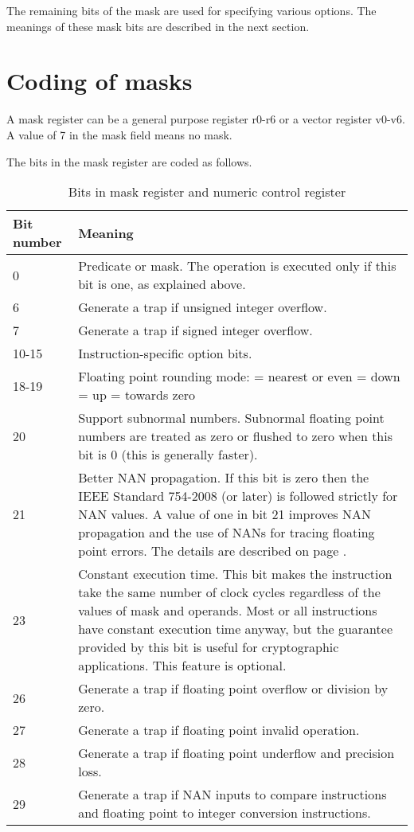 \documentclass[forwardcom.tex]{subfiles}
\begin{document}
The remaining bits of the mask are used for specifying various options.
The meanings of these mask bits are described in the next section.

\section{Coding of masks}
A mask register can be a general purpose register r0-r6 or a vector register v0-v6. A value of 7 in the mask field means no mask.
\vspace{2mm}

The bits in the mask register are coded as follows.

\begin{longtable}
{|p{15mm}|p{90mm}|}
\caption{Bits in mask register and numeric control register}
\label{table:maskBits}
\endfirsthead
\endhead
\hline
\bfseries Bit number & \bfseries Meaning \\
 \hline
0 & Predicate or mask. The operation is executed only if this bit is one, as explained above.\\
\hline
6 & Generate a trap if unsigned integer overflow. \\
\hline
7 & Generate a trap if signed integer overflow. \\
\hline
10-15 & Instruction-specific option bits.\\

\hline
18-19 & Floating point rounding mode: \newline
00 = nearest or even \newline
01 = down \newline
10 = up \newline
11 = towards zero \\
\hline
20 & Support subnormal numbers. Subnormal floating point numbers are treated as zero or flushed to zero when this bit is 0 (this is generally faster). \\
\hline
21 & Better NAN propagation. If this bit is zero then the IEEE Standard 754-2008 (or later) is followed strictly for NAN values. A value of one in bit 21 improves NAN propagation and the use of NANs for tracing floating point errors. The details are described on page \pageref{nanPropagation}. \\
\hline
23 & Constant execution time. This bit makes the instruction take the same number of clock cycles
regardless of the values of mask and operands. Most or all instructions have constant execution time anyway, but the guarantee provided by this bit is useful for cryptographic applications. This feature is optional. \\
\hline
26 & Generate a trap if floating point overflow or division by zero.  \\
\hline
27 & Generate a trap if floating point invalid operation. \\
\hline
28 & Generate a trap if floating point underflow and precision loss. \\
\hline
29 & Generate a trap if NAN inputs to compare instructions and floating point to integer conversion instructions.\\
\hline
\end{longtable}
\end{document}

